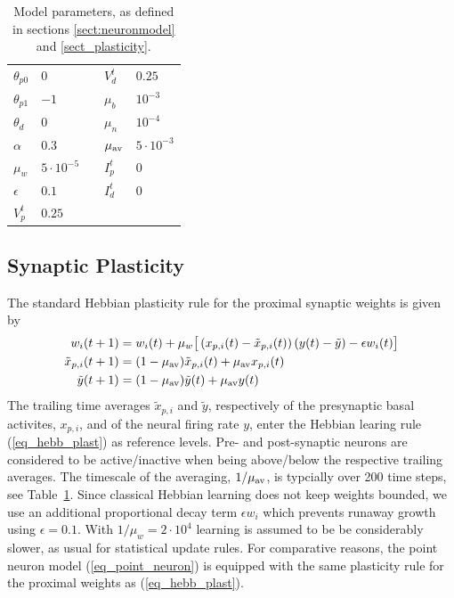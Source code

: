 \documentclass[utf8]{frontiersSCNS} %
\begin{document}
\begin{table}[b]
\caption{Model parameters,
as defined in sections \ref{sect:neuronmodel} and
\ref{sect_plasticity}.}
\begin{tabular}{ l | l || l | l }
		$\theta_{p0}$ & $0$ & $V_d^t$ & $0.25$ \\
		$\theta_{p1}$ & $-1$ & $\mu_b$ & $10^{-3}$ \\ 
		$\theta_{d}$ & $0$ & $\mu_n$ & $10^{-4}$ \\  
		$\alpha$ & $0.3$ & $\mu_{\rm av}$ & $5 \cdot 10^{-3}$ \\   
		$\mu_w$ & $5 \cdot 10^{-5}\quad$ & $I_p^t$ & $0$ \\
		$\epsilon$ & $0.1$ & $I_d^t$ & $0$ \\
		$V_p^t$ & $0.25$ &  &
\end{tabular}
\label{tab_parameters}
\end{table}

\subsection{Synaptic Plasticity\label{sect_plasticity}}

The standard Hebbian plasticity rule for the 
proximal synaptic weights is given by
\begin{align}
w_i(t+1) &= w_i(t) + \mu_w 
\big[\left(x_{p,i}(t) - \tilde{x}_{p,i}(t)\right)
\left(y(t) - \tilde{y} \right) - \epsilon w_i(t) \big]
\label{eq_hebb_plast} \\
\tilde{x}_{p,i}(t+1) &= 
(1-\mu_{\rm av})\tilde{x}_{p,i}(t) + \mu_{\rm av}x_{p,i}(t) 
\label{eq_tilde_x_p_i}\\
\tilde{y}(t+1) &= (1-\mu_{\rm av})\tilde{y}(t) + \mu_{\rm av}y(t)
\label{eq_tilde_y}
\end{align}
The trailing time averages $\tilde{x}_{p,i}$ and
$\tilde{y}$, respectively of the presynaptic 
basal activites, $x_{p,i}$, and of the neural
firing rate $y$, enter the Hebbian learing
rule (\ref{eq_hebb_plast}) as reference levels.
Pre- and post-synaptic neurons are considered
to be active/inactive when being above/below
the respective trailing averages. The
timescale of the averaging, $1/\mu_{\rm av}$,
is typcially over 200 time steps, see
Table~\ref{tab_parameters}.
Since classical Hebbian learning does not keep
weights bounded, we use an additional proportional decay
term $\epsilon w_i$ which prevents runaway
growth using $\epsilon = 0.1$.
With $1/\mu_w=2\cdot10^4$ learning is 
assumed to be be considerably slower, 
as usual for statistical update rules.
For comparative reasons, the point neuron 
model (\ref{eq_point_neuron}) is equipped 
with the same plasticity rule for the proximal 
weights as (\ref{eq_hebb_plast}).
\end{document}
